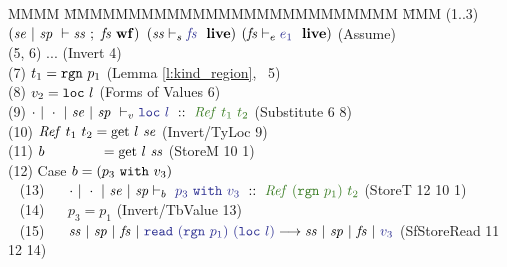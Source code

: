 \begin{tabbing}
MMMM    \= MMMMMMMMMMMMMMMMMMMMMMMMMM \= MMM         \kill
(1..3)  \>       $(\mathit{se} ~|~ \mathit{sp} ~\vdash \mathit{ss} ~;~ \mathit{fs} ~ {\mathbf{wf}})$
           \quad $(\LiveS{\mss}{\mfs})$
           \quad $(\LiveE{\mfs}{e_1})$
        \> (Assume)
\\ 
(5, 6)  \> ...
        \> (Invert 4)
\\
(7)     \> $t_1 = \texttt{rgn}~ p_1$
        \> (Lemma \ref{l:kind_region},~ 5)
\\
(8)     \> $v_2 = \texttt{loc}~ l$
        \> (Forms of Values 6)
\\ 
(9)     \> $\TypeV{\nil}{\nil}{\mse}{\msp}
                  {\vloc{l}}{\tref{t_1}{t_2}}$
        \> (Substitute 6 8)
\\
(10)     \> $\mathit{Ref}~ t_1~ t_2 = \textrm{get}~ l~ \mathit{se}$
        \> (Invert/TyLoc 9)
\\      
(11)    \> $b ~~~~~~~~~~~~ = \textrm{get}~ l~ \mathit{ss}$
        \> (StoreM 10 1)
\\[1ex]

(12)    \> Case $b = (p_3 ~\texttt{with}~ v_3)$
\\
~ (13)  \> ~~ $\TypeB{\nil}{\nil}
                  {\mse}{\msp}
                  {\sbvalue{p_3}{v_3}}
                  {\tref{(\trgn{p_1})}{t_2}}$
        \> (StoreT 12 10 1)
\\
~ (14)  \> ~~ $p_3 = p_1$
        \> (Invert/TbValue 13)
\\      
~ (15)  \> ~~  $\StepF{\mss}{\msp}{\mfs}{\kread~ (\trgn{p_1})~ (\vloc{l})}
                  {\mss}{\msp}{\mfs}{v_3}$
        \> (SfStoreRead 11 12 14)
\\[1ex]


\end{tabbing}
